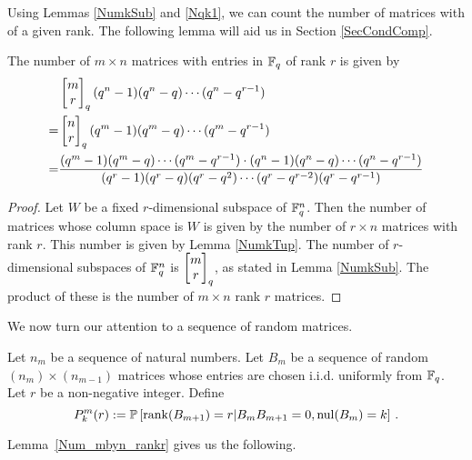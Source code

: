 Using Lemmas \ref{NumkSub} and \ref{Nqk1}, we can count the number of matrices with of a given rank. The following lemma will aid us in Section \ref{SecCondComp}.

\begin{lemma}\label{Num_mbyn_rankr}
The number of $m\times n$ matrices with entries in $\mathbb{F}_q$ of rank $r$ is given by
\begin{align*}
	&\begin{bmatrix}{m}\\ {r}\end{bmatrix}_q(q^n-1)(q^n-q)\cdots (q^n-q^{r-1})\\
   =& \begin{bmatrix}{n}\\ {r}\end{bmatrix}_q(q^m-1)(q^m-q)\cdots (q^m-q^{r-1})\\
   =& \frac{(q^m-1) (q^m-q) \cdots (q^m-q^{r-1})\cdot
            (q^n-1) (q^n-q) \cdots (q^n-q^{r-1})}
	 		      {(q^r-1)(q^r - q)(q^r - q^2)\cdots (q^r - q^{r-2})(q^r-q^{r-1})}
\end{align*}
\end{lemma}

\begin{proof}
  Let $W$ be a fixed $r$-dimensional subspace of $\mathbb{F}_q^{n}$.  Then the number of matrices whose column space is $W$ is given by the number of $r\times n$ matrices with rank $r$.  This number is given by Lemma \ref{NumkTup}. The number of $r$-dimensional subspaces of $\mathbb{F}_q^{n}$ is $\begin{bmatrix}{m}\\ {r}\end{bmatrix}_q$, as stated in Lemma \ref{NumkSub}.  The product of these is the number of $m\times n$ rank $r$ matrices.
\end{proof}

We now turn our attention to a sequence of random matrices.

\begin{definition}\label{defPkmr}
Let $n_m$ be a sequence of natural numbers. Let $B_m$ be a sequence of random $(n_m) \times (n_{m-1})$ matrices whose entries are chosen i.i.d. uniformly from $\mathbb{F}_q$. Let $r$ be a non-negative integer.  Define 
\[
  P^m_k(r) := \mathbb{P} 
  \left[\operatorname{\mathrm{rank}}(B_{m+1}) = r|B_{m}B_{m+1} = 0, \mathrm{nul}(B_{m}) = k \right] \, .
\]
\end{definition}


Lemma~\ref{Num_mbyn_rankr} gives us the following.

